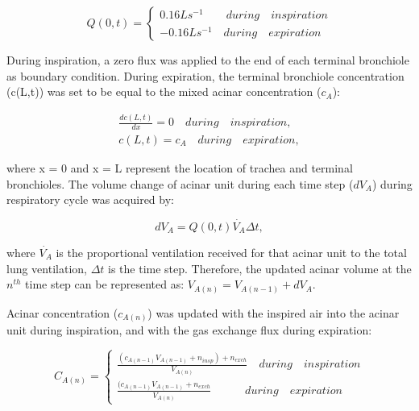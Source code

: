 \begin{equation} 
 \label{eq:TracheaFlow}
 Q(0,t) = \begin{cases}
 0.16Ls^{-1} \quad\quad during \quad inspiration\\
 -0.16Ls^{-1} \quad during \quad expiration
 \end{cases}
\end{equation}

During inspiration, a zero flux was applied to the end of each terminal bronchiole as boundary condition. During expiration, the terminal bronchiole concentration (c(L,t)) was set to be equal to the mixed acinar concentration ($c_A$):

\begin{equation} 
 \label{eq:TerminalBoundaryCondition}
 \begin{split}
 \frac{dc(L,t)}{dx} = 0 \quad during \quad inspiration, \\
 c(L,t) = c_A \quad during \quad expiration,
 \end{split}
\end{equation}

\noindent where x = 0 and x = L represent the location of trachea and terminal bronchioles. The volume change of acinar unit during each time step ($dV_A$) during respiratory cycle was acquired by:

\begin{equation} 
 \label{eq:StepAcinarVolumeChange}
 dV_A = Q(0,t)\dot{V_A}\Delta t,
\end{equation}

\noindent where $\dot{V_A}$ is the proportional ventilation received for that acinar unit to the total lung ventilation, $\Delta t$ is the time step. Therefore, the updated acinar volume at the $n^{th}$ time step can be represented as: $V_{A(n)} = V_{A(n-1)} + dV_A$.

Acinar concentration ($c_{A(n)}$) was updated with the inspired air into the acinar unit during inspiration, and with the gas exchange flux during expiration:

\begin{equation} 
 \label{eq:TracheaFlow}
 C_{A(n)} = \begin{cases}
 \frac{(c_{A(n-1)}V_{A(n-1)} + n_{insp}) + n_{exch}}{V_{A(n)}} \quad during \quad inspiration\\
 \frac{(c_{A(n-1)}V_{A(n-1)} + n_{exch}}{V_{A(n)}} \quad\quad\quad during \quad expiration
 \end{cases}
\end{equation}

